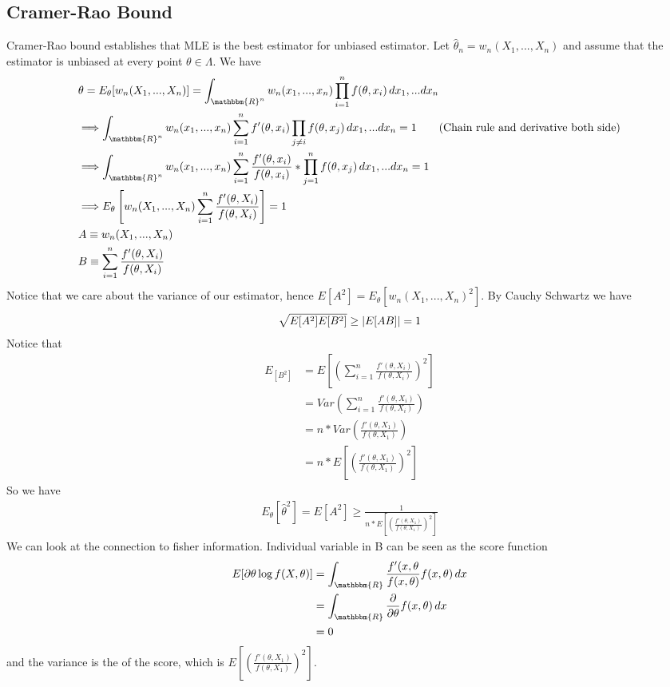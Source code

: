     
\subsection{Cramer-Rao Bound}
Cramer-Rao bound establishes that MLE is the best estimator for unbiased estimator. Let $\hat{\theta}_n = w_n(X_1, ..., X_n)$ and assume that the estimator is unbiased at every point $\theta \in \Lambda$. We have 
    \begin{align*}
        & \theta = E_\theta[w_n(X_1, ..., X_n)]
        = \int_{\mathbbm{R}^n} w_n(x_1, ..., x_n) \prod_{i=1}^n f(\theta, x_i) \, dx_1, ...dx_n \\
        & \Longrightarrow  \int_{\mathbbm{R}^n} w_n(x_1, ..., x_n) \sum_{i=1}^nf'(\theta,x_i)\prod_{j\neq i}f(\theta,x_j)\, dx_1, ...dx_n = 1 \tag{Chain rule and derivative both side} \\
        & \Longrightarrow \int_{\mathbbm{R}^n} w_n(x_1, ..., x_n) \sum_{i=1}^n \frac{f'(\theta,x_i)}{f(\theta,x_i)} * \prod_{j=1}^n f(\theta,x_j) \, dx_1, ...dx_n = 1\\
        & \Longrightarrow E_\theta\left[w_n(X_1, ..., X_n) \sum_{i=1}^n \frac{f'(\theta,X_i)}{f(\theta,X_i)} \right] = 1\\
        & A \equiv w_n(X_1, ..., X_n)  \\
        & B \equiv  \sum_{i=1}^n \frac{f'(\theta,X_i)}{f(\theta,X_i)}
    \end{align*}
Notice that we care about the variance of our estimator, hence $E[A^2] = E_\theta[w_n(X_1, ..., X_n)^2]$. By Cauchy Schwartz we have 
    \begin{align*}
        \sqrt{E[A^2] E[B^2]} \geq \left| E[AB] \right| = 1
    \end{align*}
Notice that 
    \begin{align*}
        E_[B^2] 
        & = E\left[ \left( \sum_{i=1}^n \frac{f'(\theta,X_i)}{f(\theta,X_i)} \right)^2 \right]\\
        & = Var\left(\sum_{i=1}^n \frac{f'(\theta,X_i)}{f(\theta,X_i)}  \right) \tag{Mean 0} \\
        & = n * Var\left(\frac{f'(\theta,X_1)}{f(\theta,X_1)} \right) \\
        & = n * E\left[\left(\frac{f'(\theta,X_1)}{f(\theta,X_1)} \right)^2 \right]
    \end{align*}
So we have 
    \begin{align*}
        E_\theta[\hat{\theta}^2] = E[A^2] \geq \frac{1}{n * E\left[\left(\frac{f'(\theta,X_1)}{f(\theta,X_1)} \right)^2 \right]}
    \end{align*}
We can look at the connection to fisher information. Individual variable in B can be seen as the score function 
    \begin{align*}
        E[\partial{\theta} \log f(X, \theta)]
        & = \int_{\mathbbm{R}} \frac{f'(x, \theta}{f(x,\theta)} f(x,\theta) \, dx\\
        & =  \int_{\mathbbm{R}} \partiald{\theta} f(x,\theta) \, dx \\
        & = 0
    \end{align*}
and the variance is the of the score, which is $E\left[\left(\frac{f'(\theta,X_1)}{f(\theta,X_1)} \right)^2 \right]$. 



